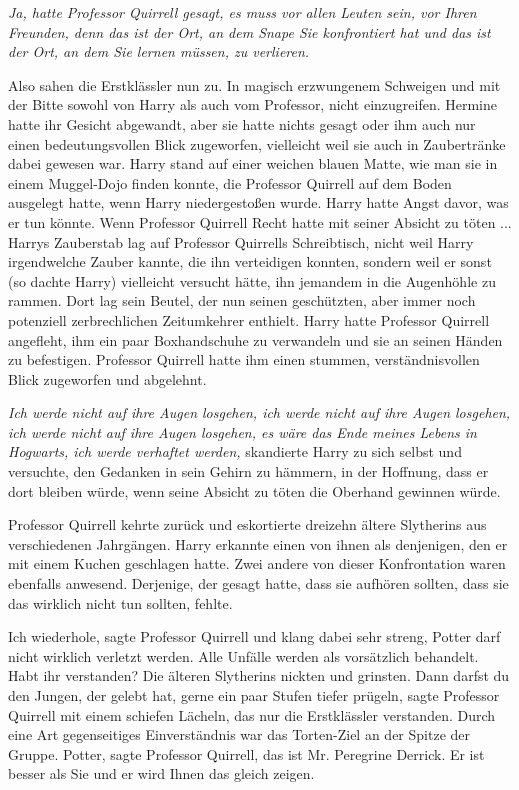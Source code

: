 \emph{Ja, hatte Professor Quirrell gesagt, es muss vor allen Leuten sein, vor
Ihren Freunden, denn das ist der Ort, an dem Snape Sie konfrontiert hat und das
ist der Ort, an dem Sie lernen müssen, zu verlieren.}

Also sahen die Erstklässler nun zu. In magisch erzwungenem Schweigen und mit der
Bitte sowohl von Harry als auch vom Professor, nicht einzugreifen. Hermine hatte
ihr Gesicht abgewandt, aber sie hatte nichts gesagt oder ihm auch nur einen
bedeutungsvollen Blick zugeworfen, vielleicht weil sie auch in Zaubertränke
dabei gewesen war. Harry stand auf einer weichen blauen Matte, wie man sie in
einem Muggel-Dojo finden konnte, die Professor Quirrell auf dem Boden ausgelegt
hatte, wenn Harry niedergestoßen wurde. Harry hatte Angst davor, was er tun
könnte. Wenn Professor Quirrell Recht hatte mit seiner Absicht zu töten ...
Harrys Zauberstab lag auf Professor Quirrells Schreibtisch, nicht weil Harry
irgendwelche Zauber kannte, die ihn verteidigen konnten, sondern weil er sonst
(so dachte Harry) vielleicht versucht hätte, ihn jemandem in die Augenhöhle zu
rammen. Dort lag sein Beutel, der nun seinen geschützten, aber immer noch
potenziell zerbrechlichen Zeitumkehrer enthielt. Harry hatte Professor Quirrell
angefleht, ihm ein paar Boxhandschuhe zu verwandeln und sie an seinen Händen zu
befestigen. Professor Quirrell hatte ihm einen stummen, verständnisvollen Blick
zugeworfen und abgelehnt.

\emph{Ich werde nicht auf ihre Augen losgehen, ich werde nicht auf ihre Augen
losgehen, ich werde nicht auf ihre Augen losgehen, es wäre das Ende meines
Lebens in Hogwarts, ich werde verhaftet werden,} skandierte Harry zu sich selbst
und versuchte, den Gedanken in sein Gehirn zu hämmern, in der Hoffnung, dass er
dort bleiben würde, wenn seine Absicht zu töten die Oberhand gewinnen würde.

Professor Quirrell kehrte zurück und eskortierte dreizehn ältere Slytherins aus
verschiedenen Jahrgängen. Harry erkannte einen von ihnen als denjenigen, den er
mit einem Kuchen geschlagen hatte. Zwei andere von dieser Konfrontation waren
ebenfalls anwesend. Derjenige, der gesagt hatte, dass sie aufhören sollten, dass
sie das wirklich nicht tun sollten, fehlte.

\glqq{}Ich wiederhole\grqq{}, sagte Professor Quirrell und klang dabei sehr
streng, \glqq{}Potter darf nicht wirklich verletzt werden. Alle Unfälle werden
als vorsätzlich behandelt. Habt ihr verstanden?\grqq{} Die älteren Slytherins
nickten und grinsten. \glqq{}Dann darfst du den Jungen, der gelebt hat, gerne ein
paar Stufen tiefer prügeln\grqq{}, sagte Professor Quirrell mit einem schiefen
Lächeln, das nur die Erstklässler verstanden. Durch eine Art gegenseitiges
Einverständnis war das Torten-Ziel an der Spitze der Gruppe. \glqq{}
Potter\grqq{}, sagte Professor Quirrell, \glqq{}das ist Mr. Peregrine Derrick. Er
ist besser als Sie und er wird Ihnen das gleich zeigen.\grqq{}

